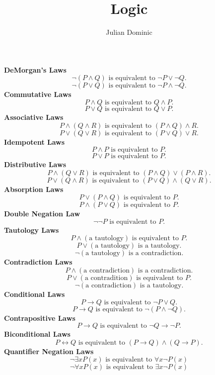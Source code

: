 \documentclass[../setup.tex]{subfiles}
\begin{document}
\title{Logic}
\author{Julian Dominic}
\date{}
\maketitle

\noindent\textbf{DeMorgan's Laws} 
	\[\neg(P \land Q) \text{ is equivalent to } \neg P \lor \neg Q.\]
	\[\neg(P \lor Q) \text{ is equivalent to } \neg P \land \neg Q.\]
\textbf{Commutative Laws}
	\[P \land Q \text{ is equivalent to } Q \land P.\]
	\[ P \lor Q \text{ is equivalent to } Q \lor P.\]
\textbf{Associative Laws}
	\[P \land (Q \land R) \text{ is equivalent to } (P \land Q) \land R.\] 
	\[P \lor (Q \lor R) \text{ is equivalent to } (P \lor Q) \lor R.\]
\textbf{Idempotent Laws}
	\[ P \land P \text { is equivalent to } P.\]
	\[P \lor P \text{ is equivalent to } P.\]
\textbf{Distributive Laws}
	\[ P \land (Q \lor R) \text{ is equivalent to } (P \land Q) \lor (P \land R).\]
	\[ P \lor (Q \land R) \text{ is equivalent to } (P \lor Q) \land (Q \lor R).\]
\textbf{Absorption Laws}
	\[P \lor (P \land Q) \text{ is equivalent to } P.\]
	\[P \land (P \lor Q) \text{ is equivalent to } P.\]
\textbf{Double Negation Law}
	\[\neg\neg P \text{ is equivalent to } P.\]
\textbf{Tautology Laws}
	\[ P \land (\text{a tautology}) \text{ is equivalent to } P. \]
	\[P \lor (\text{a tautology}) \text{ is a tautology}. \]
	\[ \neg(\text{a tautology}) \text{ is a contradiction}. \]
\textbf{Contradiction Laws}
	\[ P \land (\text{a contradiction}) \text{ is a contradiction}. \]
	\[ P \lor (\text{a contradition}) \text{ is equivalent to } P. \]
	\[ \neg(\text{a contradiction}) \text{ is a tautology}. \]
\textbf{Conditional Laws}
	\[ P \rightarrow Q \text{ is equivalent to } \neg P \lor Q. \]
	\[ P \rightarrow Q \text{ is equivalent to } \neg(P \land \neg Q). \]
\textbf{Contrapositive Laws}
	\[ P \rightarrow Q \text{ is equivalent to } \neg Q \rightarrow \neg P. \]
\textbf{Biconditional Laws}
	\[ P \leftrightarrow Q \text{ is equivalent to } (P \rightarrow Q) \land (Q \rightarrow P). \]
\textbf{Quantifier Negation Laws}
	\[ \neg\exists xP(x) \text{ is equivalent to } \forall x\neg P(x) \]
	\[ \neg\forall xP(x) \text{ is equivalent to } \exists x \neg P(x) \] 
\end{document}
